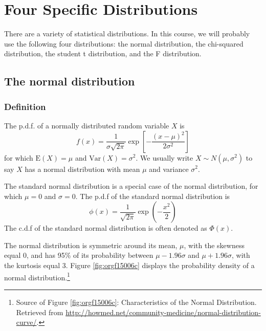\documentclass[a4paper,11pt]{article}
\begin{document}
\section{Four Specific Distributions}
\label{sec:orgee82e83}

There are a variety of statistical distributions. In this course, we
will probably use the following four distributions: the normal
distribution, the chi-squared distribution, the student t
distribution, and the F distribution. 

\subsection{The normal distribution}
\label{sec:org2cf7366}

\subsubsection*{Definition}
\label{sec:orgda5adbe}
The p.d.f. of a normally distributed random variable \(X\) is
\[ f(x) =
\frac{1}{\sigma\sqrt{2\pi}}\exp\left[-\frac{(x-\mu)^{2}}{2\sigma^{2}}\right]
\]
for which \(\mathrm{E}(X) = \mu\) and \(\mathrm{Var}(X) = \sigma^{2}\). We
usually write \(X \sim N(\mu, \sigma^{2})\) to say \(X\) has a normal
distribution with mean \(\mu\) and variance \(\sigma^2\). 

The standard normal distribution is a special case of the normal
distribution, for which \(\mu = 0\) and \(\sigma = 0\). The p.d.f of the
standard normal distribution is
\[
\phi(x) = \frac{1}{\sqrt{2\pi}}\exp\left(-\frac{x^2}{2}\right)
\]
The c.d.f of the standard normal distribution is often denoted as
\(\Phi(x)\).

The normal distribution is symmetric around its mean, \(\mu\), with the
skewness equal 0, and has 95\% of its probability between
\(\mu-1.96\sigma\) and \(\mu+1.96\sigma\), with the kurtosis
equal 3. Figure \ref{fig:orgf15006c} displays the probability density of a
normal distribution.\footnote{Source of Figure \ref{fig:orgf15006c}: Characteristics of the
Normal Distribution. Retrieved from
\url{http://howmed.net/community-medicine/normal-distribution-curve/}.}
\end{document}
